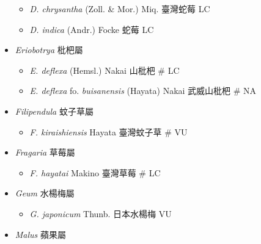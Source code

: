 \begin{itemize}
  \begin{itemize}
        \item[] \textit{D. chrysantha} (Zoll. \& Mor.) Miq.  臺灣蛇莓   LC
        \item[] \textit{D. indica} (Andr.) Focke  蛇莓   LC
  \end{itemize}
 \item[] \textit{Eriobotrya} 枇杷屬
                                
  \begin{itemize}
        \item[] \textit{E. deflexa} (Hemsl.) Nakai  山枇杷  \# LC
        \item[] \textit{E. deflexa} fo. \textit{buisanensis} (Hayata) Nakai  武威山枇杷  \# NA
  \end{itemize}
 \item[] \textit{Filipendula} 蚊子草屬
                                
  \begin{itemize}
        \item[] \textit{F. kiraishiensis} Hayata  臺灣蚊子草  \# VU
  \end{itemize}
 \item[] \textit{Fragaria} 草莓屬
                                
  \begin{itemize}
        \item[] \textit{F. hayatai} Makino  臺灣草莓  \# LC
  \end{itemize}
 \item[] \textit{Geum} 水楊梅屬
                                
  \begin{itemize}
        \item[] \textit{G. japonicum} Thunb.  日本水楊梅   VU
  \end{itemize}
 \item[] \textit{Malus} 蘋果屬
                                

\end{itemize}
